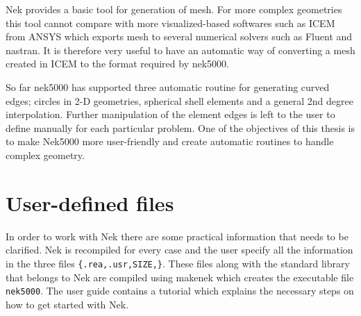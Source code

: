 Nek provides a basic tool for generation of mesh. For more complex geometries this tool cannot compare with more visualized-based softwares 
such as ICEM from ANSYS which exports mesh to several numerical solvers such as Fluent and nastran.
It is therefore very useful to have an automatic way of converting a mesh created in ICEM to the format required by nek5000. 

So far nek5000 has supported three automatic routine for generating curved edges;
circles in 2-D geometries, spherical shell elements and a general 2nd degree interpolation.
Further manipulation of the element edges is left to the user to define manually
for each particular problem. One of the objectives of this thesis is to make Nek5000 more
user-friendly and create automatic routines to handle complex geometry.



\section{User-defined files}
In order to work with Nek there are some practical information that needs to be clarified.
Nek is recompiled for every case and the user specify all the information in the three files 
\verb|{.rea,.usr,SIZE,}|. These files along with the standard library that belongs to Nek are 
compiled using makenek which creates the executable file \verb|nek5000|. 
The user guide \cite{Nek} contains a tutorial which explains the necessary 
steps on how to get started with Nek.
%

